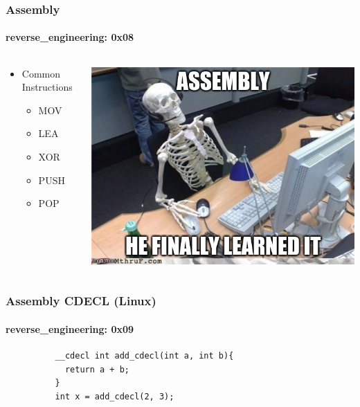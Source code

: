 \documentclass[aspectratio=169]{beamer}
\begin{document}
\begin{frame}
  \frametitle{Assembly}
  \framesubtitle{reverse\_engineering: 0x08}
  \begin{columns}
    \begin{column}{.35\textwidth}
      \begin{itemize}
      \item{Common Instructions}
        \begin{itemize}
        \item{MOV}
        \item{LEA}
        \item{XOR}
        \item{PUSH}
        \item{POP}
      \end{itemize}
    \end{itemize}
    \end{column}
    \hfill
    \begin{column}{0.65\textwidth}
      \begin{center}
        \includegraphics[scale=0.40]{assembly-meme}
      \end{center}
    \end{column}
  \end{columns}
\end{frame}

\begin{frame}[fragile]{}
  \frametitle{Assembly CDECL (Linux)}
  \framesubtitle{reverse\_engineering: 0x09}
  \begin{center}
    \begin{tcolorbox}[title=cdecl.c,colback=black]
        \begin{verbatim}
          __cdecl int add_cdecl(int a, int b){
            return a + b;
          }
          int x = add_cdecl(2, 3);
        \end{verbatim}
    \end{tcolorbox}
  \end{center}
\end{frame}
\end{document}
